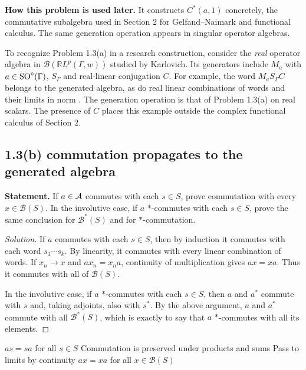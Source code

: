 \noindent\textbf{How this problem is used later.} It constructs $C^*(a,1)$ concretely, the commutative subalgebra used in Section 2 for Gelfand--Naimark and functional calculus. The same generation operation appears in singular operator algebras.

\begin{investigacion}[title={Generation of a real operator algebra}]
To recognize Problem 1.3(a) in a research construction, consider the \emph{real} operator algebra in $\mathcal B(\mathbb R L^p(\Gamma,w))$ studied by Karlovich.
Its generators include $M_a$ with $a\in\operatorname{SO}^\diamond(\Gamma)$, $S_\Gamma$ and
real-linear conjugation $C$. For example, the word $M_aS_\Gamma C$ belongs to
the generated algebra, as do real linear combinations of words and their limits in
norm \cite[Eq.~(1.4), p.~3]{Karlovich2025}.
The generation operation is that of Problem 1.3(a) on real scalars. The presence of $C$
places this example outside the complex functional calculus of Section 2.
\end{investigacion}

\subsection*{1.3(b) commutation propagates to the generated algebra}

\noindent\textbf{Statement.} If $a\in\mathcal A$ commutes with each $s\in S$, prove commutation with every $x\in\mathcal B(S)$. In the involutive case, if $a$ $*$-commutes with each $s\in S$, prove the same conclusion for $\mathcal B^*(S)$ and for $*$-commutation.

\begin{proof}[Solution]
If $a$ commutes with each $s\in S$, then by induction it commutes with each word
$s_1\cdots s_k$. By linearity, it commutes with every linear combination of words. If
$x_n\to x$ and $ax_n=x_na$, continuity of multiplication gives $ax=x a$. Thus it commutes with all of
$\mathcal B(S)$.

In the involutive case, if $a$ $*$-commutes with each $s\in S$, then $a$ and $a^*$ commute with
$s$ and, taking adjoints, also with $s^*$. By the above argument, $a$ and $a^*$ commute with
all $\mathcal B^*(S)$, which is exactly to say that $a$ $*$-commutes with all its elements.
\end{proof}

\proofdiagram
{$as=sa$ for all $s\in S$}
{Commutation is preserved under products and sums}
{Pass to limits by continuity}
{$ax=xa$ for all $x\in\mathcal B(S)$}

